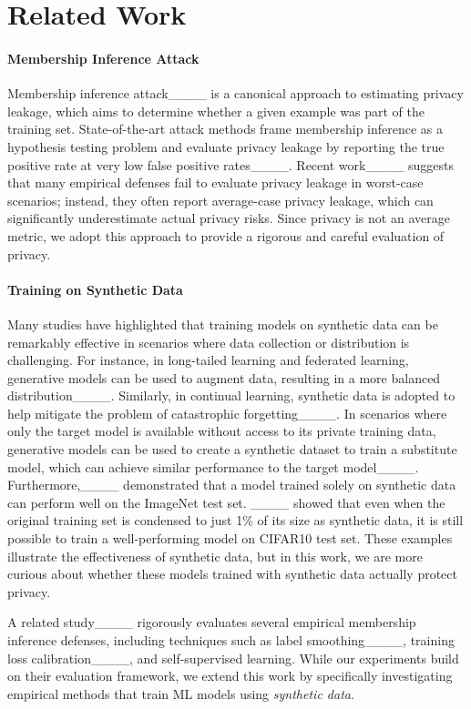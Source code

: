 \section{Related Work}
\paragraph{Membership Inference Attack}
Membership inference attack____ is a canonical approach to estimating privacy leakage, which aims to determine whether a given example was part of the training set. State-of-the-art attack methods frame membership inference as a hypothesis testing problem and evaluate privacy leakage by reporting the true positive rate at very low false positive rates____. Recent work____ suggests that many empirical defenses fail to evaluate privacy leakage in worst-case scenarios; instead, they often report average-case privacy leakage, which can significantly underestimate actual privacy risks. Since privacy is not an average metric, we adopt this approach to provide a rigorous and careful evaluation of privacy. 


\paragraph{Training on Synthetic Data} 
Many studies have highlighted that training models on synthetic data can be remarkably effective in scenarios where data collection or distribution is challenging. 
For instance, in long-tailed learning and federated learning, generative models can be used to augment data, resulting in a more balanced distribution____. Similarly, in continual learning, synthetic data is adopted to help mitigate the problem of catastrophic forgetting____.
In scenarios where only the target model is available without access to its private training data, generative models can be used to create a synthetic dataset to train a substitute model, which can achieve similar performance to the target model____. Furthermore,____ demonstrated that a model trained solely on synthetic data can perform well on the ImageNet test set. ____ showed that even when the original training set is condensed to just 1\% of its size as synthetic data, it is still possible to train a well-performing model on CIFAR10 test set. 
These examples illustrate the effectiveness of synthetic data, but in this work, we are more curious about whether these models trained with synthetic data actually protect privacy.

A related study____ rigorously evaluates several empirical membership inference defenses, including techniques such as label smoothing____, training loss calibration____, and self-supervised learning. While our experiments build on their evaluation framework, we extend this work by specifically investigating empirical methods that train ML models using \textit{synthetic data}.